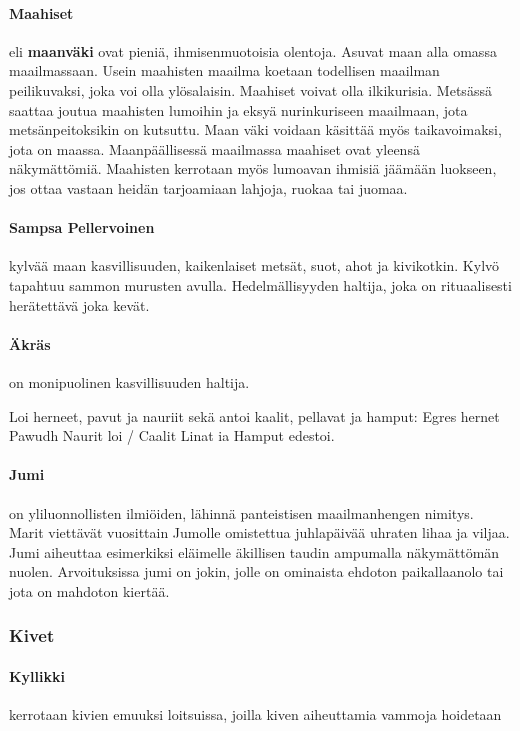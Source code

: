   \paragraph{Maahiset} eli \textbf{maanväki} ovat pieniä, ihmisenmuotoisia olentoja. Asuvat maan 
    alla omassa maailmassaan. Usein maahisten maailma koetaan todellisen maailman peilikuvaksi, 
    joka voi olla ylösalaisin. Maahiset voivat olla ilkikurisia. Metsässä saattaa joutua maahisten 
    lumoihin ja eksyä nurinkuriseen maailmaan, jota metsänpeitoksikin on kutsuttu. Maan väki 
    voidaan käsittää myös taikavoimaksi, jota on maassa. Maanpäällisessä maailmassa maahiset ovat 
    yleensä näkymättömiä. Maahisten kerrotaan myös lumoavan ihmisiä jäämään luokseen, jos ottaa 
    vastaan heidän tarjoamiaan lahjoja, ruokaa tai juomaa.
  \paragraph{Sampsa Pellervoinen} kylvää maan kasvillisuuden, kaikenlaiset metsät, suot, ahot 
    ja kivikotkin. Kylvö tapahtuu sammon murusten avulla. Hedelmällisyyden haltija, joka on 
    rituaalisesti herätettävä joka kevät. 
  \paragraph{Äkräs} on monipuolinen kasvillisuuden haltija. \begin{em}Loi herneet, pavut ja 
    nauriit sekä antoi kaalit, pellavat ja hamput: Egres hernet Pawudh Naurit loi / Caalit Linat 
    ia Hamput edestoi.\end{em}
  \paragraph{Jumi} on yliluonnollisten ilmiöiden, lähinnä panteistisen maailmanhengen nimitys. 
    Marit viettävät vuosittain Jumolle omistettua juhlapäivää uhraten lihaa ja viljaa. Jumi 
    aiheuttaa esimerkiksi eläimelle äkillisen taudin ampumalla näkymättömän nuolen. Arvoituksissa 
    jumi on jokin, jolle on ominaista ehdoton paikallaanolo tai jota on mahdoton kiertää.
    
  \subsubsection{Kivet}
    \paragraph{Kyllikki} kerrotaan kivien emuuksi loitsuissa, joilla kiven aiheuttamia vammoja 
      hoidetaan
